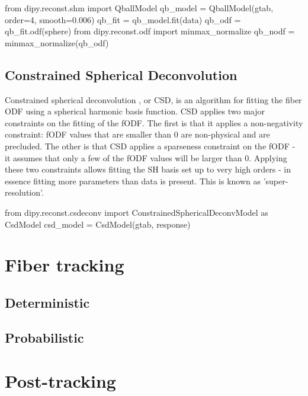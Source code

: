 \documentclass{bioinfo}
\begin{document}
\begin{python}
from dipy.reconst.shm import QballModel
qb_model = QballModel(gtab, order=4, smooth=0.006)
qb_fit = qb_model.fit(data)
qb_odf = qb_fit.odf(sphere)
from dipy.reconst.odf import minmax_normalize
qb_nodf = minmax_normalize(qb_odf)
\end{python}


\begin{python}

\end{python}

\subsection{Constrained Spherical Deconvolution}

Constrained spherical deconvolution \citep{tournier-calamante-etal:07}, or CSD, is an algorithm for fitting the fiber ODF using a spherical harmonic basis function.  CSD applies two major constraints on the fitting of the fODF. The first is that it applies a non-negativity constraint: fODF values that are smaller than 0 are non-physical and are precluded. The other is that CSD applies a sparseness constraint on the fODF - it assumes that only a few of the fODF values will be larger than 0. Applying these two constraints allows fitting the SH basis set up to very high orders - in essence fitting more parameters than data is present. This is known as 'super-resolution'.

\begin{python}
from dipy.reconst.csdeconv import
        ConstrainedSphericalDeconvModel as CsdModel
csd_model = CsdModel(gtab, response)
\end{python}

\section{Fiber tracking}

\subsection{Deterministic}

\subsection{Probabilistic}

\section{Post-tracking}
\end{document}

